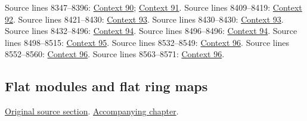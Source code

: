 \begin{AlgebraSourceRoutes}
 Source lines 8347--8396: \hyperlink{algebra-context-090}{Context 90}; \hyperlink{algebra-context-091}{Context 91}.
 Source lines 8409--8419: \hyperlink{algebra-context-092}{Context 92}.
 Source lines 8421--8430: \hyperlink{algebra-context-093}{Context 93}.
 Source lines 8430--8430: \hyperlink{algebra-context-093}{Context 93}.
 Source lines 8432--8496: \hyperlink{algebra-context-094}{Context 94}.
 Source lines 8496--8496: \hyperlink{algebra-context-094}{Context 94}.
 Source lines 8498--8515: \hyperlink{algebra-context-095}{Context 95}.
 Source lines 8532--8549: \hyperlink{algebra-context-096}{Context 96}.
 Source lines 8552--8560: \hyperlink{algebra-context-096}{Context 96}.
 Source lines 8563--8571: \hyperlink{algebra-context-096}{Context 96}.
\end{AlgebraSourceRoutes}

\subsection{Flat modules and flat ring maps}
\hypertarget{algebra-source-section-flat}{}
\noindent\href{https://github.com/stacks/stacks-project/blob/a04446e57ec1fbc252a871afcec7752fb2807b14/algebra.tex\#L8587}{Original source section}. \href{algebra.pdf\#nameddest=section-flat}{Accompanying chapter}.

